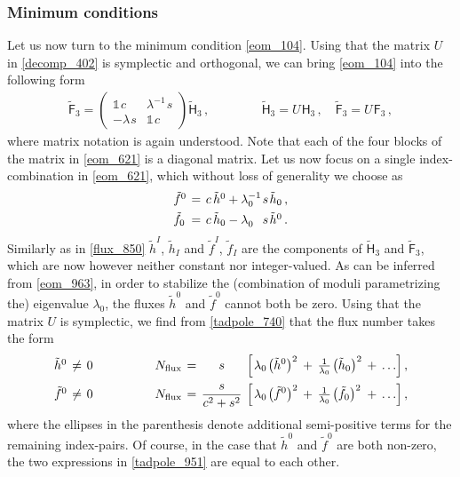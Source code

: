 \documentclass[12pt,a4paper]{article}
\newcommand{\eq}[1]{\begin{equation}
                     \begin{split} #1 \end{split}
                     \end{equation}}
\newcommand{\op}{\hspace{1pt}}
\numberwithin{equation}{section}
\begin{document}

\subsubsection*{Minimum conditions}


Let us now turn to the minimum condition \eqref{eom_104}. Using that the matrix $U$ in 
\eqref{decomp_402} is symplectic and orthogonal, we can bring \eqref{eom_104} into  the 
following form
\eq{
  \label{eom_621}
  \widetilde{\mathsf F}_3 = 
 \left( \begin{array}{cc} \mathds 1\op c &  \lambda^{-1} \op s  \\ - \lambda\op s & \mathds 1\op c \end{array}\right)
 \widetilde{\mathsf  H}_3   \,,
  \hspace{50pt}
  \widetilde{\mathsf H}_3 = U\op \mathsf H_3 \,,\quad
  \widetilde{\mathsf F}_3 = U\op \mathsf F_3 \,,
}
where matrix notation is again understood.
Note that each of the four blocks of the matrix in \eqref{eom_621} is a diagonal matrix. 
Let us now focus on a single index-combination in \eqref{eom_621}, which without loss of generality
we choose as 
\eq{
  \label{eom_963}
  \arraycolsep2pt
  \begin{array}{lcl}
  \tilde{f}^0 &=& c\,  \tilde{h}^0 + \lambda_0^{-1} \op s \op  \tilde{ h}_0 \,,
  \\[4pt]
  \tilde{f}_0 &=& c\,  \tilde{ h}_0 - \lambda_0^{\hphantom{-1}} \op s \op  \tilde{h}^0 \,.
  \end{array}
}
Similarly as in \eqref{flux_850} $\tilde h^I$, $\tilde h_I$ and $\tilde f^I$, $\tilde f_I$ are
the components of $\tilde{\mathsf H}_3$ and $\tilde{\mathsf F}_3$, which 
are now however
neither constant nor integer-valued. 
As can be inferred from \eqref{eom_963}, in order to stabilize the (combination of moduli parametrizing the) eigenvalue 
$\lambda_0$,
the fluxes $\tilde{h}^0$ and $\tilde{f}^0$ cannot both be zero. 
Using that the matrix $U$ is symplectic, 
we find from \eqref{tadpole_740} that the flux number takes the form
\eq{
  \label{tadpole_951}
  \arraycolsep2pt
  \begin{array}{lcl@{\hspace{50pt}}lcclclll}
  \tilde{ h}^0 &\neq &0 &
  N_{\rm flux} &=&\displaystyle  s& \displaystyle \Bigl[ \op\lambda_0\op \bigl(\tilde{ h}^0\bigr)^2 &+& \displaystyle
  \tfrac{1}{\lambda_0} \op \bigl(\tilde{ h}_0\bigr)^2 &+&
   \ldots \Bigr]\,,
  \\[8pt]
  \tilde{ f}^0 &\neq &0 &
  N_{\rm flux} &=&\displaystyle  \frac{s}{c^2 + s^2}& \displaystyle \Bigl[ \op\lambda_0\op \bigl(\tilde{ f}^0\bigr)^2 
  &+& \displaystyle
  \tfrac{1}{\lambda_0} \op \bigl(\tilde{ f}_0\bigr)^2 &+&
   \ldots \Bigr]\,,
  \end{array}
}
where the ellipses in the parenthesis denote additional semi-positive terms for the remaining index-pairs.
Of course, in the case that $\tilde{ h}^0$ and $\tilde{ f}^0$ are both non-zero, 
the two expressions in \eqref{tadpole_951} are equal to each other. 
\end{document}
